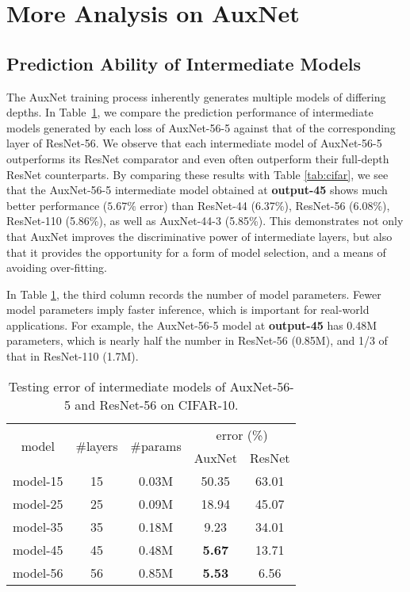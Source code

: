 \documentclass[10pt,onecolumn,letterpaper]{article}
\def\SexyName{AuxNet\xspace}
\begin{document}
\section{More Analysis on \SexyName}\label{sec:analysis}



\subsection{Prediction Ability of Intermediate Models}\label{exp:inter_models}
The \SexyName training process inherently generates multiple models of differing depths.
In Table~\ref{tab:intermediate}, we compare the prediction performance of intermediate models generated by each loss of \SexyName-56-5
against that of the corresponding layer of ResNet-56. We observe that each intermediate model of \SexyName-56-5 outperforms its ResNet comparator and even often outperform their full-depth ResNet counterparts.
By comparing these results with Table \ref{tab:cifar}, we see that
the \SexyName-56-5 intermediate model obtained at \textbf{output-45} shows much better performance ($5.67\%$ error)
than ResNet-44 (6.37\%), ResNet-56 (6.08\%), ResNet-110 (5.86\%), as well as \SexyName-44-3 (5.85\%).
This demonstrates not only that \SexyName improves the discriminative power of intermediate layers, but also that it provides the opportunity for a form of model selection, and a means of avoiding over-fitting.

In Table \ref{tab:intermediate}, the third column records the number of model parameters. Fewer model parameters imply faster inference, which is important for real-world applications. For example, the \SexyName-56-5 model at \textbf{output-45} has 0.48M parameters, which is nearly half the number in ResNet-56 (0.85M), and 1/3 of that in ResNet-110 (1.7M).

\begin{table}[htbp]
  \centering
  \caption{Testing error of intermediate models of \SexyName-56-5 and ResNet-56 on CIFAR-10.}
    \begin{tabular}{c|c|c|c|c}
    \hline
    \multirow{2}[0]{*}{model} & \multirow{2}[0]{*}{\#layers} & \multirow{2}[0]{*}{\#params} & \multicolumn{2}{c}{error (\%)} \\
    \cline{4-5}
          &       &       & \SexyName & ResNet \\
    \hline
    model-15 & 15    & 0.03M & 50.35 & 63.01 \\
    model-25 & 25    & 0.09M & 18.94 & 45.07 \\
    model-35 & 35    & 0.18M & 9.23  & 34.01 \\
    model-45 & 45    & 0.48M & \textbf{5.67}  & 13.71 \\
    model-56 & 56    & 0.85M & \textbf{5.53}  & 6.56 \\
    \hline
    \end{tabular}
  \label{tab:intermediate}
\end{table}
\end{document}
